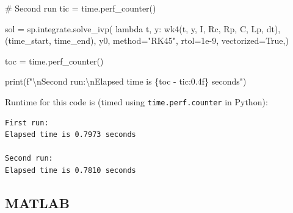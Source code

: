 \documentclass[
  a4paper,
  DIV=11,
  numbers=noendperiod,
  oneside]{scrreprt}
\newenvironment{Shaded}{\begin{snugshade}}{\end{snugshade}}
\newcommand{\BuiltInTok}[1]{\textcolor[rgb]{0.00,0.23,0.31}{#1}}
\newcommand{\CharTok}[1]{\textcolor[rgb]{0.13,0.47,0.30}{#1}}
\newcommand{\CommentTok}[1]{\textcolor[rgb]{0.37,0.37,0.37}{#1}}
\newcommand{\FloatTok}[1]{\textcolor[rgb]{0.68,0.00,0.00}{#1}}
\newcommand{\KeywordTok}[1]{\textcolor[rgb]{0.00,0.23,0.31}{#1}}
\newcommand{\NormalTok}[1]{\textcolor[rgb]{0.00,0.23,0.31}{#1}}
\newcommand{\OperatorTok}[1]{\textcolor[rgb]{0.37,0.37,0.37}{#1}}
\newcommand{\SpecialCharTok}[1]{\textcolor[rgb]{0.37,0.37,0.37}{#1}}
\newcommand{\SpecialStringTok}[1]{\textcolor[rgb]{0.13,0.47,0.30}{#1}}
\newcommand{\StringTok}[1]{\textcolor[rgb]{0.13,0.47,0.30}{#1}}
\newcommand{\VariableTok}[1]{\textcolor[rgb]{0.07,0.07,0.07}{#1}}
\begin{document}
\begin{Shaded}
\begin{Highlighting}[]
\CommentTok{\# Second run}
\NormalTok{tic }\OperatorTok{=}\NormalTok{ time.perf\_counter()}

\NormalTok{sol }\OperatorTok{=}\NormalTok{ sp.integrate.solve\_ivp(}
    \KeywordTok{lambda}\NormalTok{ t, y: wk4(t, y, I, Rc, Rp, C, Lp, dt),}
\NormalTok{    (time\_start, time\_end),}
\NormalTok{    y0,}
\NormalTok{    method}\OperatorTok{=}\StringTok{"RK45"}\NormalTok{,}
\NormalTok{    rtol}\OperatorTok{=}\FloatTok{1e{-}9}\NormalTok{,}
\NormalTok{    vectorized}\OperatorTok{=}\VariableTok{True}\NormalTok{,)}

\NormalTok{toc }\OperatorTok{=}\NormalTok{ time.perf\_counter()}

\BuiltInTok{print}\NormalTok{(}\SpecialStringTok{f"}\CharTok{\textbackslash{}n}\SpecialStringTok{Second run:}\CharTok{\textbackslash{}n}\SpecialStringTok{Elapsed time is }\SpecialCharTok{\{}\NormalTok{toc }\OperatorTok{{-}}\NormalTok{ tic}\SpecialCharTok{:0.4f\}}\SpecialStringTok{ seconds"}\NormalTok{)}
\end{Highlighting}
\end{Shaded}

Runtime for this code is (timed using \texttt{time.perf.counter} in
Python):

\begin{verbatim}
First run:
Elapsed time is 0.7973 seconds

Second run:
Elapsed time is 0.7810 seconds
\end{verbatim}

\subsection{MATLAB}
\end{document}
